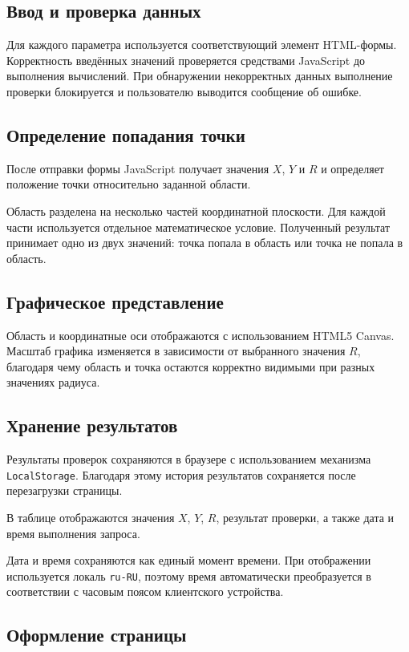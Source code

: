 \documentclass[12pt, a4paper]{article}
\begin{document}
\subsection{Ввод и проверка данных}

Для каждого параметра используется соответствующий элемент HTML-формы. Корректность введённых значений проверяется средствами JavaScript до выполнения вычислений. При обнаружении некорректных данных выполнение проверки блокируется и пользователю выводится сообщение об ошибке.

\subsection{Определение попадания точки}

После отправки формы JavaScript получает значения $X$, $Y$ и $R$ и определяет положение точки относительно заданной области.

Область разделена на несколько частей координатной плоскости. Для каждой части используется отдельное математическое условие. Полученный результат принимает одно из двух значений: точка попала в область или точка не попала в область.

\subsection{Графическое представление}

Область и координатные оси отображаются с использованием HTML5 Canvas. Масштаб графика изменяется в зависимости от выбранного значения $R$, благодаря чему область и точка остаются корректно видимыми при разных значениях радиуса.

\subsection{Хранение результатов}

Результаты проверок сохраняются в браузере с использованием механизма \texttt{LocalStorage}. Благодаря этому история результатов сохраняется после перезагрузки страницы.

В таблице отображаются значения $X$, $Y$, $R$, результат проверки, а также дата и время выполнения запроса.

Дата и время сохраняются как единый момент времени. При отображении используется локаль \texttt{ru-RU}, поэтому время автоматически преобразуется в соответствии с часовым поясом клиентского устройства.

\subsection{Оформление страницы}
\end{document}
